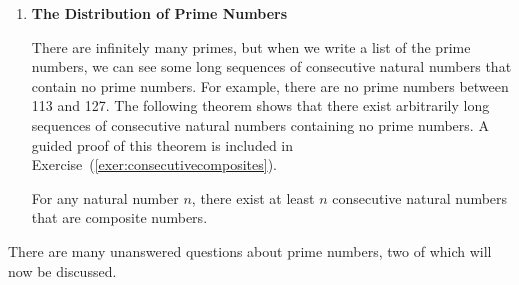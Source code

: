 \begin{enumerate}
%
%



\item \textbf{The Distribution of Prime Numbers} 
%

There are infinitely many primes, but when we write a list of the prime numbers, we can see some long sequences of consecutive natural numbers that contain no prime numbers.  For example, there are no prime numbers between 113 and 127.  The following theorem shows that there exist arbitrarily long sequences of consecutive natural numbers containing no prime numbers.  A guided proof of this theorem is included in Exercise~(\ref{exer:consecutivecomposites}).

\begin{theorem}\label{P:consecutivecomposites}
For any natural number  $n$, there exist at least  $n$  consecutive natural numbers that are composite numbers.
\end{theorem}
\end{enumerate}
%
There are many unanswered questions about prime numbers, two of which will now be discussed.

